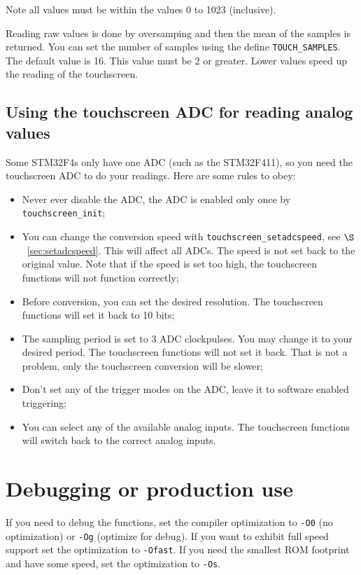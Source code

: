 \documentclass[12pt]{article}
\begin{document}
Note all values must be within the values 0 to 1023 (inclusive).

Reading raw values is done by oversamping and then the mean of the samples is returned. You can set the number of samples using the define \lstinline|TOUCH_SAMPLES|. The default value is 16. This value must be 2 or greater. Lower values speed up the reading of the touchscreen.

\subsection{Using the touchscreen ADC for reading analog values}
Some STM32F4s only have one ADC (such as the STM32F411), so you need the touchscreen ADC to do your readings. Here are some rules to obey:

\begin{itemize}
\item Never ever disable the ADC, the ADC is enabled only once by \lstinline|touchscreen_init|;
\item You can change the conversion speed with \lstinline|touchscreen_setadcspeed|, see $\S$~\ref{sec:setadcspeed}. This will affect all ADCs. The speed is not set back to the original value. Note that if the speed is set too high, the touchscreen functions will not function correctly;
\item Before conversion, you can set the desired resolution. The touchscreen functions will set it back to 10 bits;
\item The sampling period is set to 3 ADC clockpulses. You may change it to your desired period. The touchscreen functions will not set it back. That is not a problem, only the touchscreen conversion will be slower;
\item Don't set any of the trigger modes on the ADC, leave it to software enabled triggering;
\item You can select any of the available analog inputs. The touchscreen functions will switch back to the correct analog inputs. 
\end{itemize}


\section{Debugging or production use}
If you need to debug the functions, set the compiler optimization to \lstinline|-O0| (no optimization) or \lstinline|-Og| (optimize for debug). If you want to exhibit full speed support set the optimization to \lstinline|-Ofast|. If you need the smallest ROM footprint and have some speed, set the optimization to \lstinline|-Os|.
\end{document}
